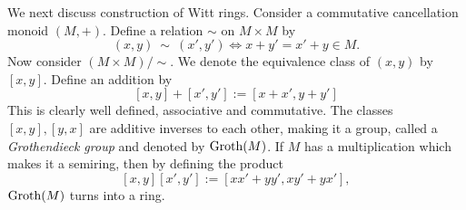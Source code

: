 \documentclass[sn-mathphys-num]{sn-jnl}%
\newtheorem{definition}[theorem]{Definition}
\begin{document}


    
    
    





\medskip 

We next discuss construction of Witt rings.
Consider a commutative cancellation monoid $(M,+)$. Define a relation $ \sim $ on $M \times M$ by
\[(x,y)\ \sim\ (x',y') \iff x+y'=x'+y \in M.\] 
Now consider $(M \times M)/ \sim$. We denote the equivalence class of $(x,y)$ by $[x,y]$. Define an addition by \[[x,y]+ [x',y']:= [x+x',y+y']\] 
This is clearly well defined, associative and commutative.
The classes $[x,y], [y,x]$ are additive inverses to each other, making it a group, called a {\it Grothendieck group} and denoted by ${\rm Groth} (M)$. If $M$ has a multiplication which makes it a semiring, then by defining the product
\[[x,y][x',y']:=[xx'+yy', xy'+yx'],\] ${\rm Groth}(M)$ turns into a ring.
\medskip
\end{document}
